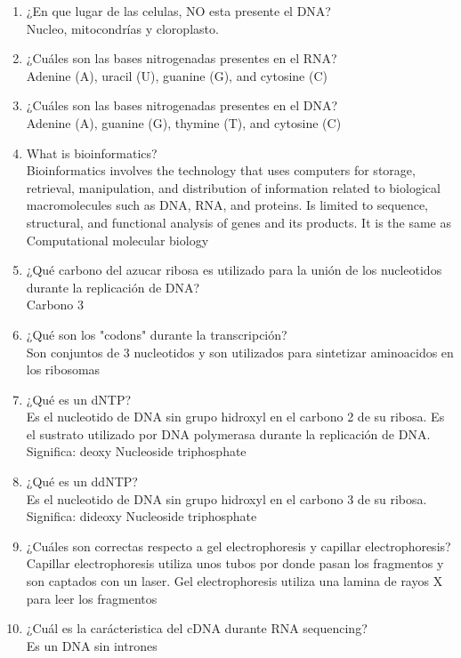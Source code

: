 \documentclass{article}
\begin{document}
\begin{enumerate}
	\item ¿En que lugar de las celulas, NO esta presente el DNA?\\
	Nucleo, mitocondrías y cloroplasto.
	\item  ¿Cuáles son las bases nitrogenadas presentes en el RNA?\\
	Adenine (A), uracil (U), guanine (G), and cytosine (C)
	\item ¿Cuáles son las bases nitrogenadas presentes en el DNA?\\
	Adenine (A), guanine (G), thymine (T), and cytosine (C)
	\item What is bioinformatics?\\
	Bioinformatics involves the technology that uses computers for storage, retrieval, manipulation, and distribution of information related to biological macromolecules such as DNA, RNA, and proteins. Is limited to sequence, structural, and functional analysis of genes and its products. It is the same as Computational molecular biology
	\item ¿Qué carbono del azucar ribosa es utilizado para la unión de los nucleotidos durante la replicación de DNA?\\
	Carbono 3
	\item ¿Qué son los "codons" durante la transcripción? \\
	Son conjuntos de 3 nucleotidos y son utilizados para sintetizar aminoacidos en los ribosomas
	\item ¿Qué es un dNTP? \\
	Es el nucleotido de DNA sin  grupo hidroxyl en el carbono 2 de su ribosa. Es el sustrato utilizado por DNA polymerasa durante la replicación de DNA. Significa: deoxy Nucleoside triphosphate
	\item ¿Qué es un ddNTP? \\
	Es el nucleotido de DNA sin  grupo hidroxyl en el carbono 3 de su ribosa. Significa: dideoxy Nucleoside triphosphate
	\item ¿Cuáles son correctas respecto a  gel electrophoresis y capillar electrophoresis?\\
	Capillar electrophoresis utiliza unos tubos por donde pasan los fragmentos y son captados con un laser. Gel electrophoresis utiliza una lamina de rayos X para leer los fragmentos
	\item ¿Cuál es la carácteristica del cDNA durante RNA sequencing?\\
	Es un DNA sin intrones
	
\end{enumerate}

%
%
\end{document}
